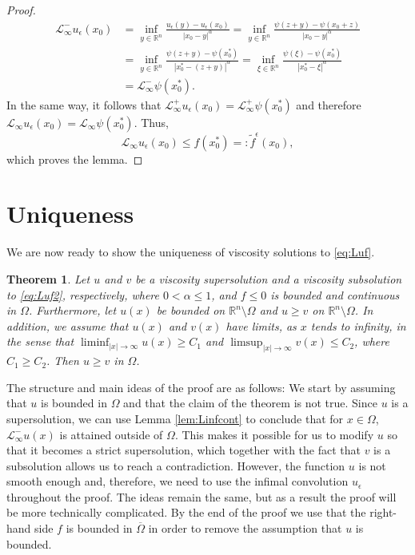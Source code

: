 \documentclass[11pt]{article}
\providecommand{\Linf}{\mathcal{L}_{\infty}}
\providecommand{\Lpos}{\mathcal{L}_{\infty}^+}
\providecommand{\Lneg}{\mathcal{L}_{\infty}^-}
\providecommand{\Rn}{\mathbb{R}^n}
\newcommand{\ol}{\overline}
\newtheorem{thm}{Theorem}[section]
\numberwithin{equation}{section}
\theoremstyle{definition}
\begin{document}
\begin{proof}
    \begin{align*}
        \Lneg u_{\epsilon}(x_0) &= \inf_{y \in \Rn} \frac{u_{\epsilon}(y) -u_{\epsilon}(x_0)}{|x_0-y|^{\alpha}} = \inf_{y \in \Rn} \frac{\psi(z+y)-\psi(x_0+z)}{|x_0-y|^{\alpha}} \\ 
        &=  \inf_{y \in \Rn} \frac{\psi(z+y)-\psi(x_0^*)}{|x_0^*-(z+y)|^{\alpha}} 
        = \inf_{\xi \in \Rn} \frac{\psi(\xi)-\psi(x_0^*)}{|x_0^*-\xi|^{\alpha}} \\
    &= \Lneg \psi(x_0^*).
    \end{align*}
    In the same way, it follows that $\Lpos u_{\epsilon}(x_0) = \Lpos \psi(x_0^*)$ and therefore $\Linf u_{\epsilon}(x_0)= \Linf \psi(x_0^*)$. Thus,
    $$
    \Linf u_{\epsilon}(x_0) \leq f(x_0^*) =: \tilde{f}^{\epsilon}(x_0),
    $$
    which proves the lemma.
\end{proof}

\section{Uniqueness}\label{sec:comparison}
We are now ready to show the uniqueness of viscosity solutions to \eqref{eq:Luf}.
\begin{thm}\label{thm:comparison}
    Let $u$ and $v$ be a viscosity supersolution and a viscosity subsolution to \eqref{eq:Luf2}, respectively, where $0 < \alpha  \leq 1$, and $f \leq 0$ is bounded and continuous in $\Omega$. Furthermore, let $u(x)$ be bounded on $ \Rn \setminus \Omega$ and $u \geq v$ on $\Rn \setminus \Omega$. In addition, we assume that $u(x)$ and $v(x)$ have limits, as $x$ tends to infinity, in the sense that $\liminf_{|x| \to \infty} u(x) \geq C_1$ and $\limsup_{|x| \to \infty} v(x) \leq C_2$, where $C_1 \geq C_2$. Then $u \geq v$ in $\Omega$.
\end{thm}

The structure and main ideas of the proof are as follows: We start by assuming that $u$ is bounded in $\Omega$ and that the claim of the theorem is not true. Since $u$ is a supersolution, we can use Lemma \ref{lem:Linfcont} to conclude that for $x \in \Omega$, $\Lneg u(x)$ is attained outside of $\Omega$. This makes it possible for us to modify $u$ so that it becomes a strict supersolution, which together with the fact that $v$ is a subsolution allows us to reach a contradiction. However, the function $u$ is not smooth enough and, therefore, we need to use the infimal convolution $u_{\epsilon}$ throughout the proof. The ideas remain the same, but as a result the proof will be more technically complicated. By the end of the proof we use that the right-hand side $f$ is bounded in $\ol{\Omega}$ in order to remove the assumption that $u$ is bounded.
\end{document}
